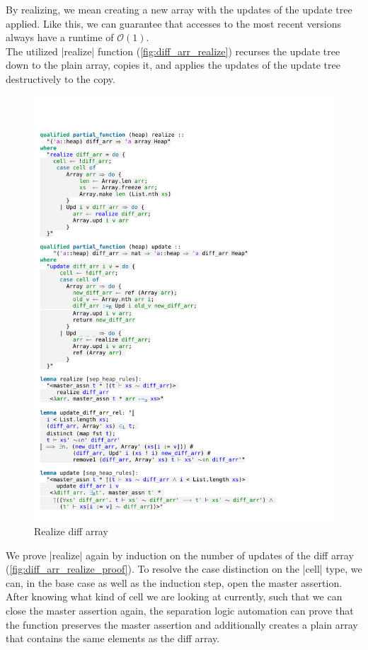 \noindent By realizing, we mean creating a new array with the updates of the update tree applied. Like this, we can guarantee that accesses to the most recent versions always have a runtime of $\mathcal{O}(1)$. \\
The utilized |realize| function (\autoref{fig:diff_arr_realize}) recurses the update tree down to the plain array, copies it, and applies the updates of the update tree destructively to the copy.

\begin{figure}[htpb]
    \includegraphics[trim={0 19,8cm 0 2,4cm}, clip, width=1.00\textwidth]{figures/Theory_Diff_Arr_Update.pdf}
    \caption[Realize diff array]{Realize diff array}
    \label{fig:diff_arr_realize}
\end{figure}

\noindent We prove |realize| again by induction on the number of updates of the diff array (\autoref{fig:diff_arr_realize_proof}). To resolve the case distinction on the |cell| type, we can, in the base case as well as the induction step, open the master assertion. After knowing what kind of cell we are looking at currently, such that we can close the master assertion again, the separation logic automation can prove that the function preserves the master assertion and additionally creates a plain array that contains the same elements as the diff array.

